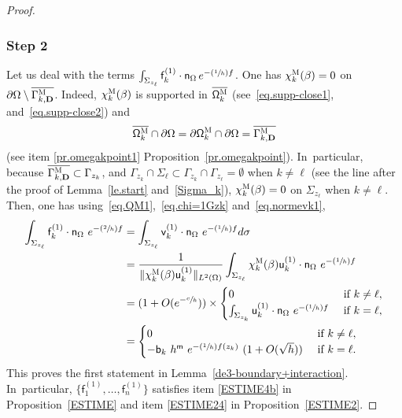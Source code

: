 \documentclass[JEP,XML,SOM,Unicode,NoEqCountersInSection,NoFloatCountersInSection,published]{cedram}
\newcommand{\Psfrac}[2]{(\sfrac{#1}{#2})}
\newcommand{\mbf}[1]{\mathbf{#1}}
\let\pa\partial
\theoremstyle{plain}
\theoremstyle{definition}
\begin{document}
\begin{proof}
\subsubsection*{Step 2} Let us deal with the terms $ \int_{\Sigma_{z_\ell}} \mathsf f_k^{(1)} \cdot \mathsf n_\Omega \, e^{- \Psfrac{1}{h} f} $.
One has
$\chi_k^{\textsc{M}} (\beta)=0$ on $\partial \Omega\setminus \overline{\Gamma_{k,\mbf D}^{ \textsc{M} }}$.
Indeed, $\chi_k^{\textsc{M}} (\beta)$ is supported in $\overline{\mathsf \Omega_k^{\textsc{M}}}$ (see~\eqref{eq.supp-close1}, and~\eqref{eq.supp-close2}) and
\[
\overline{ \mathsf \Omega_k^{\textsc{M}}}\cap \partial \Omega = \pa \mathsf \Omega_k^{\textsc{M}}\cap \partial \Omega= \overline{\Gamma_{k,\mbf D}^{\textsc{M}}}
\]
(see item \eqref{pr.omegakpoint1} Proposition~\ref{pr.omegakpoint}). In~particular, because $\overline{\Gamma_{k,\mbf D}^{\textsc{M}} }\subset \Gamma_{z_k}$, and $\Gamma_{z_k}\cap \Sigma_\ell \subset \Gamma_{z_k}\cap \Gamma_{z_\ell}=\emptyset$ when $k\neq \ell$ (see the line after the proof of Lemma~\ref{le.start} and~\eqref{Sigma_k}), $\chi_k^{\textsc{M}} (\beta)=0$ on $\Sigma_{z_\ell}$ when $k\neq \ell$.
Then, one has using~\eqref{eq.QM1},~\eqref{eq.chi=1Gzk} and~\eqref{eq.normevk1},
\begin{align*}
\int_{\Sigma_{z_\ell}} \mathsf f_k^{(1)} \cdot \mathsf n_\Omega \ e^{-\Psfrac{2}{h} f} &= \int_{\Sigma_{z_\ell}} \mathsf v_k^{(1)} \cdot \mathsf n_\Omega \ e^{- \Psfrac{1}{h} f} d\sigma\\
&= \frac{ 1}{\Vert \chi_k^{\textsc{M}} (\beta)\mathsf u_k^{(1)}\Vert _{ L^2 (\Omega) }} \int_{\Sigma_{z_\ell}} \chi_k^{\textsc{M}} (\beta) \mathsf u_k^{(1)} \cdot \mathsf n_\Omega \ e^{- \Psfrac{1}{h} f} \\
&=(1+O(e^{-\sfrac ch}))\times
\begin{cases} 0 & \text{ if } k\neq \ell,\\
\int_{\Sigma_{z_k}} \mathsf u_k^{(1)} \cdot \mathsf n_\Omega \ e^{- \Psfrac{1}{h} f} & \text{ if } k=\ell,
\end{cases} \\
&= \begin{cases} 0 & \text{ if } k\neq \ell,\\
-\mathsf b_k \ h^{\mathsf m } \ e^{-\Psfrac{1}{h} f(z_k)} \ (1 + O(\sqrt h)) & \text{ if } k=\ell.
\end{cases}
\end{align*}
This proves the first statement in Lemma~\ref{de3-boundary+interaction}. In~particular, $\{\mathsf f_1^{(1)}, \ldots, \mathsf f_n^{(1)}\} $ satisfies item \eqref{ESTIME4b} in Proposition~\ref{ESTIME} and item \eqref{ESTIME24} in Proposition~\ref{ESTIME2}.


\end{proof}
\end{document}
